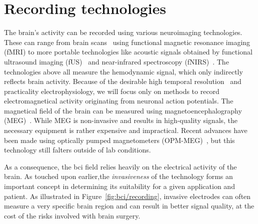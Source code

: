 

\section{Recording technologies}
\label{sec:bci-recording}


The brain's activity can be recorded using various neuroimaging
technologies.
These can range from brain scans~\cite{Weiskopf2004} using functional magnetic resonance imaging
(fMRI) to more portable technologies like acoustic signals obtained by functional ultrasound imaging
(fUS)~\cite{Zheng2023} and near-infrared spectroscopy
(fNIRS)~\cite{Borgheai2020}.
The technologies above all measure the hemodynamic signal, which only indirectly
reflects brain activity.
Because of the desirable high temporal resolution~\cite{Easttom2021} and
practicality electrophysiology, we will focus only on methods to record
electromagnetical activity originating from neuronal action potentials.
The magnetical field of the brain can be measured using magnetoencephalography
(MEG)~\cite{Mellinger2007}.
While MEG is non-invasive and results in high-quality signals, the necessary
equipment is rather expensive and impractical.
Recent advances have been made using optically pumped magnetometers
(OPM-MEG)~\cite{Wittevrongel2021}, but this technology still falters outside of
lab conditions.

As a consequence, the \ac{bci} field relies heavily on the
electrical activity of the brain.
As touched upon earlier,the \emph{invasiveness} of the technology forms an
important concept in determining its suitability for a given application and
patient.
As illustrated in Figure~\ref{fig:bci/recording}, invasive electrodes can often measure a very specific brain region and can result in better signal quality, at the cost of the risks
involved with brain surgery.


